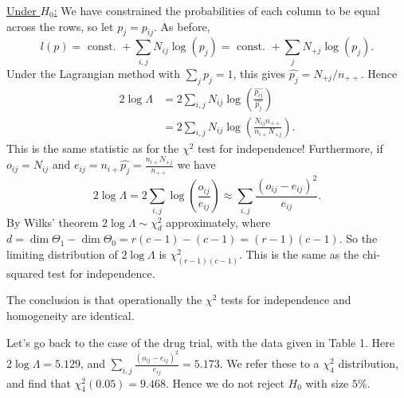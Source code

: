 \documentclass[egregdoesnotlikesansseriftitles,a4paper]{scrartcl}
\begin{document}
\underline{Under $H_0$:} We have constrained the probabilities of each column to be equal across the rows, so let $p_{j}=p_{ij}$. As before, \[
     l (p)= \text{ const. }+  \sum_{i,j}^{}N_{ij}\log (p_{j})=\text{ const. }+\sum_{j}^{}N_{+j}\log (p_{j})
.\] Under the Lagrangian method with $\sum_{j}^{}p_{j}=1$, this gives $\hat{p_{j}}= N_{+j}/n_{++}$. Hence 
\begin{align*}
     2 \log \Lambda&=2 \sum_{i,j}^{}N_{ij} \log ( \frac{\hat{p_{ij}}}{\hat{p_{j}}})\\
     &=2 \sum_{i,j}^{}N_{ij} \log ( \frac{N_{ij}n_{++}}{n_{i+}N_{+j}}).
\end{align*}
This is the same statistic as for the $\chi^2$ test for independence! Furthermore, if $o_{ij}=N_{ij}$ and $e_{ij}=n_{i+}\hat{p_{j}}= \frac{n_{i+}N_{+j}}{n_{++}}$ we have \[
2 \log \Lambda = 2 \sum_{i,j}^{}\log ( \frac{o_{ij}}{e_{ij}})\approx \sum_{i,j}^{} \frac{(o_{ij}-e_{ij})^2}{e_{ij}}
.\] By Wilks' theorem $2 \log \Lambda \sim \chi_{d}^2$ approximately, where $d=\operatorname{dim} \Theta_1 - \operatorname{dim}\Theta_0 =r (c-1)-(c-1)= (r-1)(c-1)$. So the limiting distribution of $2 \log \Lambda$ is $\chi_{(r-1)(c-1)}^2$. This is the same as the chi-squared test for independence.
\begin{remark}
      The conclusion is that operationally the $\chi^2$ tests for independence and homogeneity are identical.
\end{remark}
\begin{example*}
      Let's go back to the case of the drug trial, with the data given in Table 1. Here $2 \log \Lambda=5.129$, and $\sum_{i,j}^{}\frac{(o_{ij}-e_{ij})^2}{e_{ij}}=5.173$. We refer these to a $\chi_4^2$ distribution, and find that $\chi_4^2 (0.05)=9.468$. Hence we do not reject $H_0 $ with size $5\%$.
\end{example*}
\end{document}
